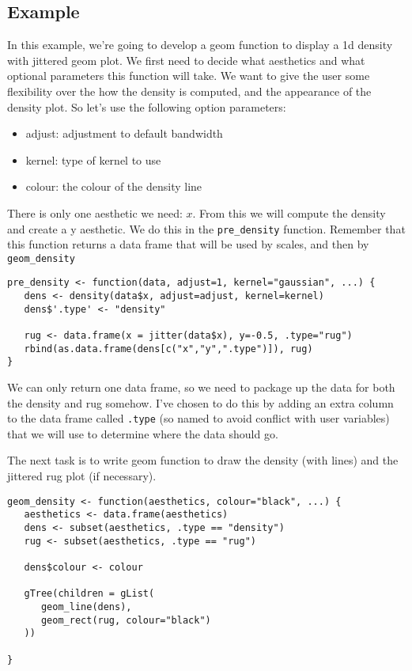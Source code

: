 \subsection{Example}\label{sub:example}

In this example, we're going to develop a geom function to display a 1d density with jittered geom plot.  We first need to decide what aesthetics and what optional parameters this function will take.  We want to give the user some flexibility over the how the density is computed, and the appearance of the density plot.  So let's use the following option parameters:

\begin{itemize}
	\item adjust: adjustment to default bandwidth
	\item kernel: type of kernel to use
	\item colour: the colour of the density line
\end{itemize}

There is only one aesthetic we need: $x$.  From this we will compute the density and create a y aesthetic.  We do this in the {\tt pre\_density} function.  Remember that this function returns a data frame that will be used by scales, and then by {\tt geom\_density}

\begin{verbatim}
pre_density <- function(data, adjust=1, kernel="gaussian", ...) {
   dens <- density(data$x, adjust=adjust, kernel=kernel)
   dens$'.type' <- "density"

   rug <- data.frame(x = jitter(data$x), y=-0.5, .type="rug")
   rbind(as.data.frame(dens[c("x","y",".type")]), rug)
}
\end{verbatim}

We can only return one data frame, so we need to package up the data for both the density and rug somehow.  I've chosen to do this by adding an extra column to the data frame called {\tt .type} (so named to avoid conflict with user variables) that we will use to determine where the data should go.

The next task is to write geom function to draw the density (with lines) and the jittered rug plot (if necessary).

\begin{verbatim}
geom_density <- function(aesthetics, colour="black", ...) {
   aesthetics <- data.frame(aesthetics)
   dens <- subset(aesthetics, .type == "density")
   rug <- subset(aesthetics, .type == "rug")

   dens$colour <- colour

   gTree(children = gList(
      geom_line(dens),
      geom_rect(rug, colour="black")
   ))

}
\end{verbatim}

